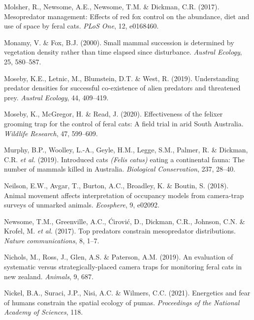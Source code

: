\documentclass[11pt,a4paper,titlepage,twoside,openright]{style/unimelbthesis}
\begin{document}
\begin{mainmatter}
\leavevmode\hypertarget{ref-molsher2017mesopredator}{}%
Molsher, R., Newsome, A.E., Newsome, T.M. \& Dickman, C.R. (2017). Mesopredator management: Effects of red fox control on the abundance, diet and use of space by feral cats. \emph{PLoS One}, 12, e0168460.

\leavevmode\hypertarget{ref-monamy2000small}{}%
Monamy, V. \& Fox, B.J. (2000). Small mammal succession is determined by vegetation density rather than time elapsed since disturbance. \emph{Austral Ecology}, 25, 580--587.

\leavevmode\hypertarget{ref-moseby2019understanding}{}%
Moseby, K.E., Letnic, M., Blumstein, D.T. \& West, R. (2019). Understanding predator densities for successful co-existence of alien predators and threatened prey. \emph{Austral Ecology}, 44, 409--419.

\leavevmode\hypertarget{ref-moseby2020effectiveness}{}%
Moseby, K., McGregor, H. \& Read, J. (2020). Effectiveness of the felixer grooming trap for the control of feral cats: A field trial in arid South Australia. \emph{Wildlife Research}, 47, 599--609.

\leavevmode\hypertarget{ref-murphy2019introduced}{}%
Murphy, B.P., Woolley, L.-A., Geyle, H.M., Legge, S.M., Palmer, R. \& Dickman, C.R. \emph{et al.} (2019). Introduced cats \emph{(Felis catus)} eating a continental fauna: The number of mammals killed in Australia. \emph{Biological Conservation}, 237, 28--40.

\leavevmode\hypertarget{ref-neilson2018animal}{}%
Neilson, E.W., Avgar, T., Burton, A.C., Broadley, K. \& Boutin, S. (2018). Animal movement affects interpretation of occupancy models from camera-trap surveys of unmarked animals. \emph{Ecosphere}, 9, e02092.

\leavevmode\hypertarget{ref-newsome2017top}{}%
Newsome, T.M., Greenville, A.C., Ćirović, D., Dickman, C.R., Johnson, C.N. \& Krofel, M. \emph{et al.} (2017). Top predators constrain mesopredator distributions. \emph{Nature communications}, 8, 1--7.

\leavevmode\hypertarget{ref-nichols2019evaluation}{}%
Nichols, M., Ross, J., Glen, A.S. \& Paterson, A.M. (2019). An evaluation of systematic versus strategically-placed camera traps for monitoring feral cats in new zealand. \emph{Animals}, 9, 687.

\leavevmode\hypertarget{ref-nickel2021energetics}{}%
Nickel, B.A., Suraci, J.P., Nisi, A.C. \& Wilmers, C.C. (2021). Energetics and fear of humans constrain the spatial ecology of pumas. \emph{Proceedings of the National Academy of Sciences}, 118.


\end{mainmatter}
\end{document}
